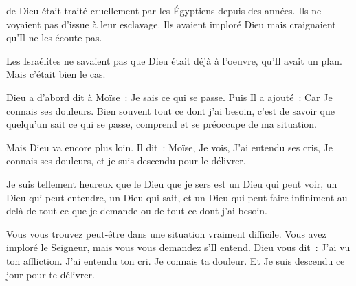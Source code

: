 

 de Dieu était traité cruellement
 par les Égyptiens depuis des années.
 Ils ne voyaient pas d'issue à leur esclavage.
 Ils avaient imploré Dieu mais craignaient qu'Il ne les écoute pas.


Les Israélites ne savaient pas que Dieu était déjà à l'oeuvre,
 qu'Il avait un plan. Mais c'était bien le cas.

Dieu a d'abord dit à Moïse~: \og Je sais ce qui se passe. \fg{}
 Puis Il a ajouté~: \og Car Je connais ses douleurs. \fg{}
 Bien souvent tout ce dont j'ai besoin,
 c'est de savoir que quelqu'un sait ce qui se passe,
 comprend et se préoccupe de ma situation.

Mais Dieu va encore plus loin. Il dit~:
 \og Moïse, Je vois, J'ai entendu ses cris, Je connais ses douleurs,
 et je suis descendu pour le délivrer. \fg{}

Je suis tellement heureux que le Dieu que je sers est un Dieu qui peut voir,
 un Dieu qui peut entendre, un Dieu qui sait,
 et un Dieu qui peut faire infiniment au-delà
 de tout ce que je demande ou de tout ce dont j'ai besoin.

Vous vous trouvez peut-être dans une situation vraiment difficile.
 Vous avez imploré le Seigneur, mais vous vous demandez s'Il entend.
 Dieu vous dit~:
 \og J'ai vu ton affliction. J'ai entendu ton cri. Je connais ta douleur.
 Et Je suis descendu ce jour pour te délivrer. \fg{}

\dvrule






